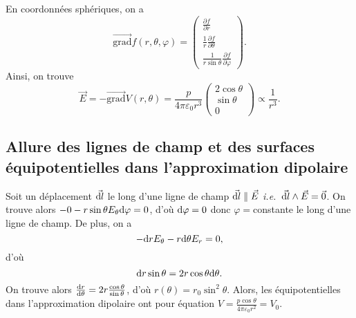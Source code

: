 En coordonnées sphériques, on a 
\begin{equation}
    \overrightarrow{\mathrm{grad}}f(r,\theta,\varphi)=\begin{pmatrix}
        \frac{\partial f}{\partial r}\\\frac{1}{r}\frac{\partial f}{\partial \theta}\\\frac{1}{r\sin\theta}\frac{\partial f}{\partial\varphi}
    \end{pmatrix}.
\end{equation}
Ainsi, on trouve
\begin{equation}
    \boxed{
        \vec{E}=-\overrightarrow{\mathrm{grad}}V(r,\theta)=\frac{p}{4\pi\varepsilon_0 r^{3}}\begin{pmatrix}
            2\cos\theta\\\sin\theta\\0
        \end{pmatrix}
    }\propto\frac{1}{r^{3}}.
\end{equation}

\subsection{Allure des lignes de champ et des surfaces équipotentielles dans l'approximation dipolaire}

Soit un déplacement $\vec{\mathrm{d} l}$ le long d'une ligne de champ $\vec{\mathrm{d} l}\parallel\vec{E}$ \emph{i.e.~}$\vec{\mathrm{d} l}\wedge\vec{E}=\vec{0}$. On trouve alors $-0-r\sin\theta E_{\theta}\mathrm{d}\varphi=0$, d'où $\mathrm{d}\varphi=0$ donc $\varphi=$constante le long d'une ligne de champ. De plus, on a 
\begin{equation}
    -\mathrm{d} rE_{\theta}-r\mathrm{d}\theta E_r=0,
\end{equation}
d'où
\begin{equation}
    \mathrm{d} r\sin\theta=2r\cos\theta\mathrm{d}\theta.
\end{equation}
On trouve alors $\frac{\mathrm{d} r}{\mathrm{d}\theta}=2r\frac{\cos\theta}{\sin\theta}$, d'où $r(\theta)=r_0\sin^{2}\theta$. Alors, les équipotentielles dans l'approximation dipolaire ont pour équation $V=\frac{p\cos\theta}{4\pi\varepsilon_0 r^{2}}=V_0$.
